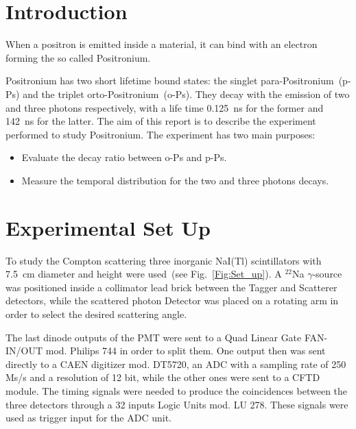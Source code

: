 \section*{Introduction}
When a positron is emitted inside a material, it can bind with an electron forming the so called Positronium. 

Positronium has two short lifetime bound states: the singlet para-Positronium~(p-Ps) and the triplet orto-Positronium~(o-Ps). They decay with the emission of two and three photons respectively, with a  life time 0.125~ns for the former and 142~ns for the latter. 
The aim of this report is to describe the experiment performed to study Positronium. The experiment has two main purposes:
\begin{itemize}
 \item Evaluate the decay ratio between o-Ps and p-Ps.
 \item Measure the temporal distribution for the two and three photons decays.
\end{itemize} 


\section*{Experimental Set Up}

To study the Compton scattering three inorganic NaI(Tl) scintillators with 7.5~cm diameter and height were used~(see Fig.~\ref{Fig:Set_up}). A $^{22}$Na $\gamma$-source was positioned inside a collimator lead brick between the Tagger and Scatterer detectors, while the scattered photon Detector was placed on a rotating arm in order to select the desired scattering angle.

The last dinode outputs of the PMT were sent to a Quad Linear Gate FAN-IN/OUT mod. Philips 744 in order to split them. One output then was sent directly to a CAEN digitizer mod. DT5720, an ADC with a sampling rate of 250 Ms/s and a resolution of 12 bit, while the other ones were sent to a  CFTD module. The timing signals were needed to produce the coincidences between the three detectors through a 32 inputs Logic Units mod. LU 278. These signals were used as trigger input for the ADC unit.
